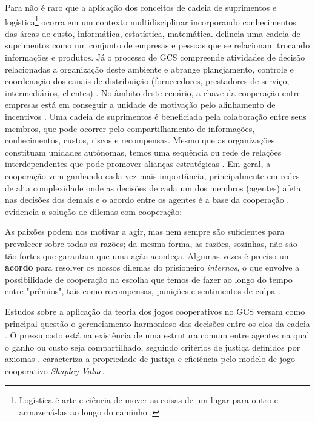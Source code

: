 \documentclass[
	article,			        %
	11pt,				          %
	oneside,			        %
	a4paper,			        %
	english,			        %
	brazil,				        %
	sumario=tradicional
]{abntex2}\usepackage[]{graphicx}\usepackage[]{color}
\begin{document}
Para  não é raro que a aplicação dos conceitos de cadeia de suprimentos e logística\footnote{Logística é arte e ciência de mover as coisas de um lugar para outro e armazená-las ao longo do caminho \cite[p.~370]{Fawcett.2000}.} ocorra em um contexto multidisciplinar incorporando conhecimentos das áreas de custo, informática, estatística, matemática.  delineia uma cadeia de suprimentos como um conjunto de empresas e pessoas que se relacionam trocando informações e produtos. Já o processo de GCS compreende atividades de decisão relacionadas a organização deste ambiente \cite{Fredendall.2001} e abrange planejamento, controle e coordenação dos canais de distribuição (fornecedores, prestadores de serviço, intermediários, clientes) \cite{Panitz.2007}. No âmbito deste cenário, a chave da cooperação entre empresas está em conseguir a unidade de motivação pelo alinhamento de incentivos \cite{Cao.2012}. Uma cadeia de suprimentos é beneficiada pela colaboração entre seus membros, que pode ocorrer pelo compartilhamento de informações, conhecimentos, custos, riscos e recompensas. Mesmo que as organizações constituam unidades autônomas, temos uma sequência ou rede de relações interdependentes que pode promover alianças estratégicas \cite{Chen.2004}. Em geral, a cooperação vem ganhando cada vez mais importância, principalmente em redes de alta complexidade \cite{Drechsel.2010} onde as decisões de cada um dos membros (agentes) afeta nas decisões dos demais e o acordo entre os agentes é a base da cooperação \cite{Young.1994}.  evidencia a solução de dilemas com cooperação: 

\begin{citacao}
As paixões podem nos motivar a agir, mas nem sempre são suficientes para prevalecer sobre todas as razões; da mesma forma, as razões, sozinhas, não são tão fortes que garantam que uma ação aconteça. Algumas vezes é preciso um \textbf{acordo} para resolver os nossos dilemas do prisioneiro \emph{internos}, o que envolve a possibilidade de cooperação na escolha que temos de fazer ao longo do tempo entre "prêmios", tais como recompensas, punições e sentimentos de culpa \cite[p.~132]{Pimentel.2007}.
\end{citacao}

Estudos sobre a aplicação da teoria dos jogos cooperativos no GCS versam como principal questão o gerenciamento harmonioso das decisões entre os elos da cadeia \cite{Dobos.2010a}. O pressuposto está na existência de uma estrutura comum entre agentes na qual o ganho ou custo seja compartilhado, seguindo critérios de justiça definidos por axiomas \cite{Bezerra.2009}.  caracteriza a propriedade de justiça e eficiência pelo modelo de jogo cooperativo \emph{Shapley Value}. 
\end{document}
